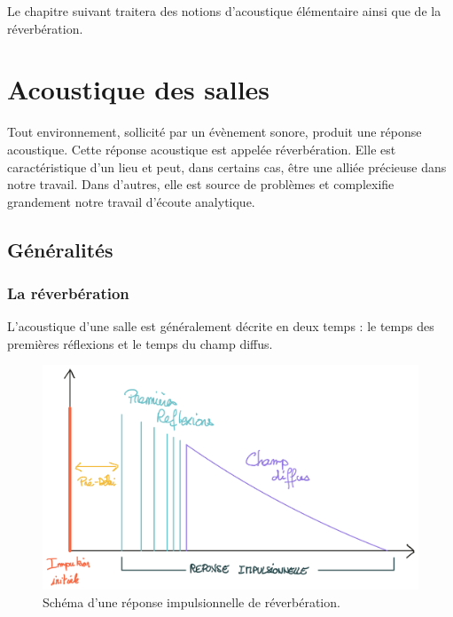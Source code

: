 \documentclass[
]{book}
\begin{document}
Le chapitre suivant traitera des notions d'acoustique élémentaire ainsi que de la réverbération.

\hypertarget{acoustique-des-salles}{%
\chapter{Acoustique des salles}\label{acoustique-des-salles}}

Tout environnement, sollicité par un évènement sonore, produit une réponse acoustique. Cette réponse acoustique est appelée réverbération. Elle est caractéristique d'un lieu et peut, dans certains cas, être une alliée précieuse dans notre travail. Dans d'autres, elle est source de problèmes et complexifie grandement notre travail d'écoute analytique.

\hypertarget{guxe9nuxe9ralituxe9s}{%
\section{Généralités}\label{guxe9nuxe9ralituxe9s}}

\hypertarget{la-ruxe9verbuxe9ration}{%
\subsection{La réverbération}\label{la-ruxe9verbuxe9ration}}

L'acoustique d'une salle est généralement décrite en deux temps : le temps des premières réflexions et le temps du champ diffus.

\begin{figure}

{\centering \includegraphics{_resources/drawings/reverb} 

}

\caption{Schéma d'une réponse impulsionnelle de réverbération.}\label{fig:unnamed-chunk-9}
\end{figure}
\end{document}
